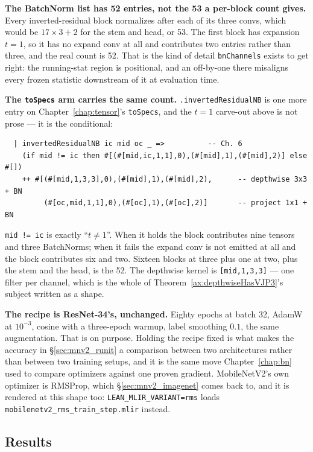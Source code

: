 \textbf{The BatchNorm list has 52 entries, not the 53 a per-block count
gives.} Every inverted-residual block normalizes after each of its three
convs, which would be $17 \times 3 + 2$ for the stem and head, or 53. The
first block has expansion $t{=}1$, so it has no expand conv at all and
contributes two entries rather than three, and the real count is 52. That
is the kind of detail \texttt{bnChannels} exists to get right: the
running-stat region is positional, and an off-by-one there misaligns every
frozen statistic downstream of it at evaluation time.

\textbf{The \texttt{toSpecs} arm carries the same count.}
\texttt{.invertedResidualNB} is one more entry on
Chapter~\ref{chap:tensor}'s \texttt{toSpecs}, and the $t{=}1$ carve-out
above is not prose --- it is the conditional:

\begin{verbatim}
  | invertedResidualNB ic mid oc _ =>          -- Ch. 6
    (if mid != ic then #[(#[mid,ic,1,1],0),(#[mid],1),(#[mid],2)] else #[])
    ++ #[(#[mid,1,3,3],0),(#[mid],1),(#[mid],2),      -- depthwise 3x3 + BN
         (#[oc,mid,1,1],0),(#[oc],1),(#[oc],2)]       -- project 1x1 + BN
\end{verbatim}

\noindent \texttt{mid != ic} is exactly ``$t \neq 1$''. When it holds the
block contributes nine tensors and three BatchNorms; when it fails the
expand conv is not emitted at all and the block contributes six and two.
Sixteen blocks at three plus one at two, plus the stem and the head, is
the 52. The depthwise kernel is \texttt{[mid,1,3,3]} --- one filter per
channel, which is the whole of Theorem~\ref{ax:depthwiseHasVJP3}'s
subject written as a shape.

\textbf{The recipe is ResNet-34's, unchanged.} Eighty epochs at batch 32,
AdamW at $10^{-3}$, cosine with a three-epoch warmup, label smoothing
$0.1$, the same augmentation. That is on purpose. Holding the recipe fixed
is what makes the accuracy in \S\ref{sec:mnv2_runit} a comparison between
two architectures rather than between two training setups, and it
is the same move Chapter~\ref{chap:bn} used to compare optimizers against
one proven gradient. MobileNetV2's own optimizer is RMSProp, which
\S\ref{sec:mnv2_imagenet} comes back to, and it is rendered at this shape
too: \texttt{LEAN\_MLIR\_VARIANT=rms} loads
\texttt{mobilenetv2\_rms\_train\_step.mlir} instead.

\subsection*{Results}

